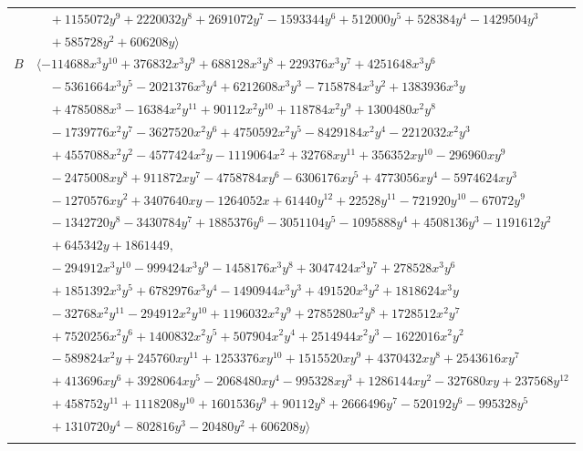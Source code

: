\documentclass[11pt]{article}
\begin{document}
\begin{longtable}{@{}ll@{}}
 & $\quad +1155072y^{9}+2220032y^{8}+2691072y^{7}-1593344y^{6}+512000y^{5}+528384y^{4}-1429504y^{3}$\\
 & $\quad +585728y^{2}+606208y\rangle$\\
$B$ & $\langle -114688x^{3}y^{10}+376832x^{3}y^{9}+688128x^{3}y^{8}+229376x^{3}y^{7}+4251648x^{3}y^{6}$\\
 & $\quad -5361664x^{3}y^{5}-2021376x^{3}y^{4}+6212608x^{3}y^{3}-7158784x^{3}y^{2}+1383936x^{3}y$\\
 & $\quad +4785088x^{3}-16384x^{2}y^{11}+90112x^{2}y^{10}+118784x^{2}y^{9}+1300480x^{2}y^{8}$\\
 & $\quad -1739776x^{2}y^{7}-3627520x^{2}y^{6}+4750592x^{2}y^{5}-8429184x^{2}y^{4}-2212032x^{2}y^{3}$\\
 & $\quad +4557088x^{2}y^{2}-4577424x^{2}y-1119064x^{2}+32768xy^{11}+356352xy^{10}-296960xy^{9}$\\
 & $\quad -2475008xy^{8}+911872xy^{7}-4758784xy^{6}-6306176xy^{5}+4773056xy^{4}-5974624xy^{3}$\\
 & $\quad -1270576xy^{2}+3407640xy-1264052x+61440y^{12}+22528y^{11}-721920y^{10}-67072y^{9}$\\
 & $\quad -1342720y^{8}-3430784y^{7}+1885376y^{6}-3051104y^{5}-1095888y^{4}+4508136y^{3}-1191612y^{2}$\\
 & $\quad +645342y+1861449,$\\
 & $\quad -294912x^{3}y^{10}-999424x^{3}y^{9}-1458176x^{3}y^{8}+3047424x^{3}y^{7}+278528x^{3}y^{6}$\\
 & $\quad +1851392x^{3}y^{5}+6782976x^{3}y^{4}-1490944x^{3}y^{3}+491520x^{3}y^{2}+1818624x^{3}y$\\
 & $\quad -32768x^{2}y^{11}-294912x^{2}y^{10}+1196032x^{2}y^{9}+2785280x^{2}y^{8}+1728512x^{2}y^{7}$\\
 & $\quad +7520256x^{2}y^{6}+1400832x^{2}y^{5}+507904x^{2}y^{4}+2514944x^{2}y^{3}-1622016x^{2}y^{2}$\\
 & $\quad -589824x^{2}y+245760xy^{11}+1253376xy^{10}+1515520xy^{9}+4370432xy^{8}+2543616xy^{7}$\\
 & $\quad +413696xy^{6}+3928064xy^{5}-2068480xy^{4}-995328xy^{3}+1286144xy^{2}-327680xy+237568y^{12}$\\
 & $\quad +458752y^{11}+1118208y^{10}+1601536y^{9}+90112y^{8}+2666496y^{7}-520192y^{6}-995328y^{5}$\\
 & $\quad +1310720y^{4}-802816y^{3}-20480y^{2}+606208y\rangle$\\
\addlinespace[2pt]
\multicolumn{2}{@{}p{0.97\textwidth}@{}}{$i=20$, $D_i=2$, $\rho_{ij}$: $11{:}1, \allowbreak 12{:}1, \allowbreak 14{:}1, \allowbreak 18{:}1, \allowbreak 19{:}1, \allowbreak 37{:}2$}\\

\end{longtable}
\end{document}
